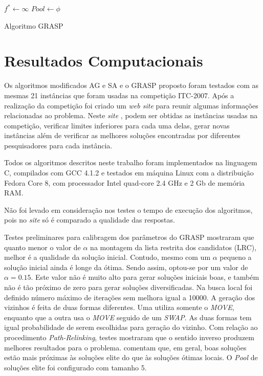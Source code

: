 \documentclass[11pt]{article}
\begin{document}
\begin{algorithm}[H]
\label{algoGrasp}
\SetAlgoLined
{}

$f^{*} \leftarrow \infty $ \;
$Pool \leftarrow \phi $ \;
\caption{Algoritmo GRASP}
\end{algorithm}


\section{Resultados Computacionais}
\label{sec:resultados}

Os algoritmos modificados AG e SA e o GRASP proposto foram testados com as mesmas 21 instâncias que foram usadas na competição ITC-2007. Após a realização da competição foi criado um \textit{web site} para reunir algumas informações relacionadas ao problema. Neste \textit{site} \cite{ctt}, podem ser obtidas as instâncias usadas na competição, verificar limites inferiores para cada uma delas, gerar novas instâncias além de verificar as melhores soluções encontradas por diferentes pesquisadores para cada instância.

Todos os algoritmos descritos neste trabalho foram implementados na linguagem C, compilados com GCC 4.1.2 e testados em máquina Linux com a distribuição Fedora Core 8, com processador Intel quad-core 2.4 GHz e 2 Gb de memória RAM.

Não foi levado em consideração nos testes o tempo de execução dos algoritmos, pois no \textit{site} \cite{ctt} só é comparado a qualidade das respostas.

Testes preliminares para calibragem dos parâmetros do GRASP mostraram que quanto menor o valor de $\alpha$ na montagem da lista restrita dos candidatos (LRC), melhor é a qualidade da solução inicial. Contudo, mesmo com um $\alpha$ pequeno a solução inicial ainda é longe da ótima. Sendo assim, optou-se por um valor de $\alpha = 0.15$. Este valor não é muito alto para gerar soluções iniciais boas, e também não é tão próximo de zero para gerar soluções diversificadas. Na busca local foi definido número máximo de iterações sem melhora igual a 10000. A geração dos vizinhos é feita de duas formas diferentes. Uma utiliza somente o \textit{MOVE}, enquanto que a outra usa o \textit{MOVE} seguido de um \textit{SWAP}. As duas formas tem igual probabilidade de serem escolhidas para geração do vizinho. Com relação ao procedimento \textit{Path-Relinking}, testes mostraram que o sentido inverso produzem melhores resultados para o problema. \cite{grasp_resende_ribeiro} comentam que, em geral, boas soluções estão mais próximas às soluções elite do que às soluções ótimas locais. O \textit{Pool} de soluções elite foi configurado com tamanho 5.
\end{document}
